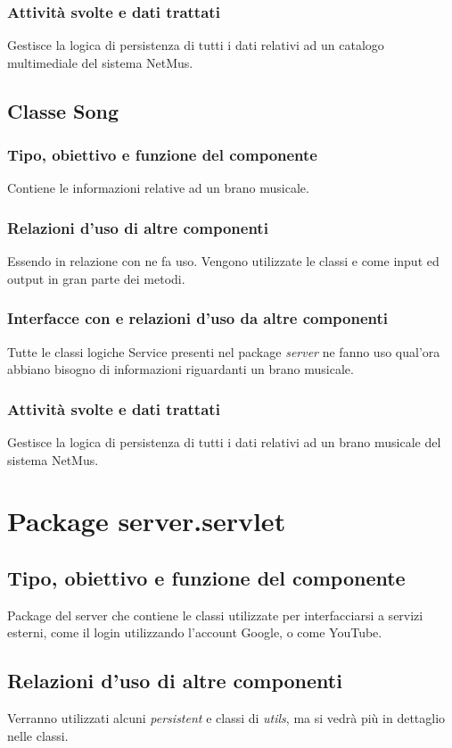 \subsubsection*{Attivit\`a svolte e dati trattati} Gestisce la logica di
persistenza di tutti i dati relativi ad un catalogo multimediale del sistema
NetMus.

\subsection{Classe Song}
\subsubsection*{Tipo, obiettivo e funzione del componente} Contiene le
informazioni relative ad un brano musicale. 
\subsubsection*{Relazioni d'uso di
altre componenti} Essendo in relazione con  ne fa uso. Vengono
utilizzate le classi  e  come input ed output
in gran parte dei metodi. 
\subsubsection*{Interfacce con e relazioni d'uso da
altre componenti} Tutte le classi logiche Service presenti nel package
\emph{server} ne fanno uso qual'ora abbiano bisogno di informazioni riguardanti
un brano musicale. 
\subsubsection*{Attivit\`a svolte e dati trattati} Gestisce
la logica di persistenza di tutti i dati relativi ad un brano musicale del
sistema NetMus.

\section{Package server.servlet}
\subsection*{Tipo, obiettivo e funzione del componente}
Package del server che contiene le classi utilizzate per interfacciarsi a
servizi esterni, come il login utilizzando l'account Google, o come YouTube.

\subsection*{Relazioni d'uso di altre componenti}
Verranno utilizzati alcuni \emph{persistent} e classi di \emph{utils}, ma
si vedr\`a pi\`u in dettaglio nelle classi.

